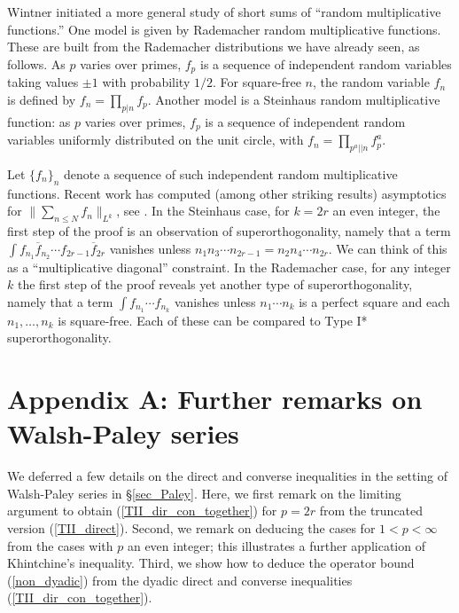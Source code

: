 \documentclass[oneside,11pt]{amsart}
\begin{document}
Wintner \cite{Win44} initiated a more general study of short sums of ``random multiplicative functions.''  One model is given by Rademacher  random multiplicative functions. These are built from the Rademacher distributions we have already seen, as follows. As $p$ varies over primes, $f_p$ is a sequence of independent random variables taking values $\pm 1$ with probability $1/2$. For square-free $n$, the random variable $f_n$ is defined by $f_n = \prod_{p|n} f_p$. 
Another model is a Steinhaus random multiplicative function:  as $p$ varies over primes, $f_p$ is a sequence of independent random variables uniformly distributed on the unit circle, with $f_n = \prod_{p^a || n} f_p^a$. 

 Let $\{f_n\}_n$ denote a sequence of such independent random multiplicative functions. Recent work    has computed (among other striking results) asymptotics for   
$ \| \sum_{n \leq N} f_n \|_{L^{k}} $, see \cite{HNR15,HeaLin15}. In the Steinhaus case, for $k=2r$ an even integer, the first step of the proof is an observation of superorthogonality, namely that a term $\int f_{n_1} \overline{f}_{n_2} \cdots f_{2r-1} \overline{f}_{2r}$ vanishes unless $n_1n_3 \cdots n_{2r-1} = n_2n_4 \cdots n_{2r}$.  We can think of this as a ``multiplicative diagonal'' constraint.
 In the Rademacher case, for any integer $k$ the first step  of the proof reveals yet another type of superorthogonality, namely  that a term 
 $\int f_{n_1} \cdots f_{n_k}$ vanishes unless $n_1 \cdots n_k$ is a perfect square  and each $n_1, \ldots, n_k$ is square-free.
 Each of these can be compared to Type I* superorthogonality.
 

\setcounter{section}{1}
 \renewcommand{\thesection}{\Alph{section}}
 
 \setcounter{subsection}{0}
 
  \section*{Appendix A: Further remarks on Walsh-Paley series }\label{sec_app_Paley}
  
    \setcounter{equation}{0}
\renewcommand{\theequation}{A.\arabic{equation}}

We deferred a few details on the direct and converse inequalities in the setting of Walsh-Paley series  in \S \ref{sec_Paley}.
Here, we first remark on the limiting argument to obtain (\ref{TII_dir_con_together}) for $p=2r$ from the truncated version (\ref{TII_direct}).
  Second, we remark on deducing the cases for $1<p<\infty$ from the cases with $p$ an even integer; this illustrates  a further application of   Khintchine's inequality.
Third, we  show how to deduce the operator bound (\ref{non_dyadic}) from the dyadic direct and converse inequalities (\ref{TII_dir_con_together}).
 
\end{document}
